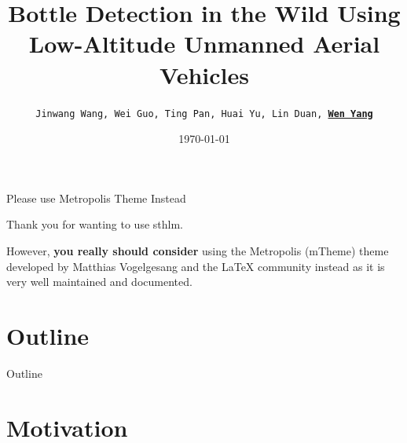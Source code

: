 \documentclass[newPxFont,numfooter,sectionpages]{beamer}
\title{\centering Bottle Detection in the Wild Using Low-Altitude Unmanned Aerial Vehicles}
\author{\texttt{\small Jinwang Wang, Wei Guo, Ting Pan, Huai Yu, Lin Duan, \underline{\textbf{Wen Yang}}}}
\institute{Wuhan University(WHU)}
\date{\today}
\begin{document}
    
    
    \maketitle
    
    \begingroup
    \begin{frame}{Please use Metropolis Theme Instead}
    
    Thank you for wanting to use sthlm.
    
    \vspace{1em}
    
    However, \textbf{you really should consider} using the Metropolis (mTheme) theme developed by Matthias Vogelgesang and the LaTeX community instead as it is very well maintained and documented.
    
    \begin{center}
    \end{center}
    \end{frame}
    \endgroup
    
    
    
    \section*{Outline}
    \begin{frame}{Outline}
    \tableofcontents[hideallsubsections]
    \end{frame}
    
    
    \section{Motivation}
    
\end{document}
